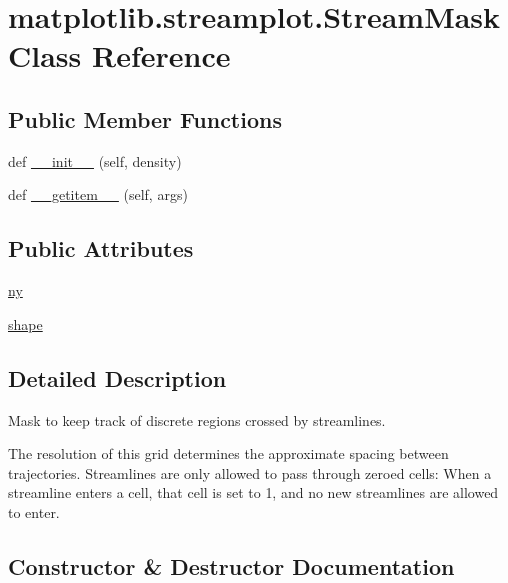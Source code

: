 \hypertarget{classmatplotlib_1_1streamplot_1_1StreamMask}{}\section{matplotlib.\+streamplot.\+Stream\+Mask Class Reference}
\label{classmatplotlib_1_1streamplot_1_1StreamMask}
\subsection*{Public Member Functions}
\begin{DoxyCompactItemize}
\item 
def \hyperlink{classmatplotlib_1_1streamplot_1_1StreamMask_a3cade3c9ad2542a18ed733ccb71a8a3f}{\+\_\+\+\_\+init\+\_\+\+\_\+} (self, density)
\item 
def \hyperlink{classmatplotlib_1_1streamplot_1_1StreamMask_ad55e4930a228d5f195580c87ce8d2092}{\+\_\+\+\_\+getitem\+\_\+\+\_\+} (self, args)
\end{DoxyCompactItemize}
\subsection*{Public Attributes}
\begin{DoxyCompactItemize}
\item 
\hyperlink{classmatplotlib_1_1streamplot_1_1StreamMask_ac1b67709a3205f09fe5dc48a0e3c8a1b}{ny}
\item 
\hyperlink{classmatplotlib_1_1streamplot_1_1StreamMask_a47ecd4bba81385caca7a09a8cfc708b0}{shape}
\end{DoxyCompactItemize}


\subsection{Detailed Description}
\begin{DoxyVerb}Mask to keep track of discrete regions crossed by streamlines.

The resolution of this grid determines the approximate spacing between
trajectories. Streamlines are only allowed to pass through zeroed cells:
When a streamline enters a cell, that cell is set to 1, and no new
streamlines are allowed to enter.
\end{DoxyVerb}
 

\subsection{Constructor \& Destructor Documentation}
\mbox{\label{classmatplotlib_1_1streamplot_1_1StreamMask_a3cade3c9ad2542a18ed733ccb71a8a3f}} 
